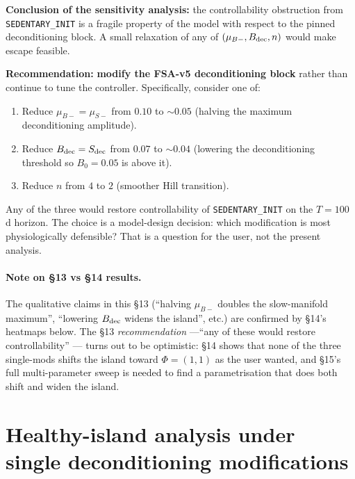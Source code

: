 \documentclass[11pt,a4paper]{article}
\theoremstyle{definition}
\begin{document}
\textbf{Conclusion of the sensitivity analysis:} the controllability obstruction from \texttt{SEDENTARY\_INIT} is a fragile property of the model with respect to the pinned deconditioning block. A small relaxation of any of $(\mu_{B-}, B_{\rm dec}, n)$ would make escape feasible.

\textbf{Recommendation:} \textbf{modify the FSA-v5 deconditioning block} rather than continue to tune the controller. Specifically, consider one of:

\begin{enumerate}
  \item Reduce $\mu_{B-} = \mu_{S-}$ from $0.10$ to $\sim 0.05$ (halving the maximum deconditioning amplitude).
  \item Reduce $B_{\rm dec} = S_{\rm dec}$ from $0.07$ to $\sim 0.04$ (lowering the deconditioning threshold so $B_0 = 0.05$ is above it).
  \item Reduce $n$ from $4$ to $2$ (smoother Hill transition).
\end{enumerate}

Any of the three would restore controllability of \texttt{SEDENTARY\_INIT} on the $T = 100$\,d horizon. The choice is a model-design decision: which modification is most physiologically defensible? That is a question for the user, not the present analysis.

\paragraph{Note on §13 vs §14 results.} The qualitative claims in this §13 (``halving \(\mu_{B-}\) doubles the slow-manifold maximum'', ``lowering \(B_{\rm dec}\) widens the island'', etc.) are confirmed by §14's heatmaps below. The §13 \emph{recommendation} —``any of these would restore controllability'' — turns out to be optimistic: §14 shows that none of the three single-mods shifts the island toward \(\Phi = (1,1)\) as the user wanted, and §15's full multi-parameter sweep is needed to find a parametrisation that does both shift and widen the island.

\section{Healthy-island analysis under single deconditioning modifications} \label{sec:single-mods}
\end{document}
